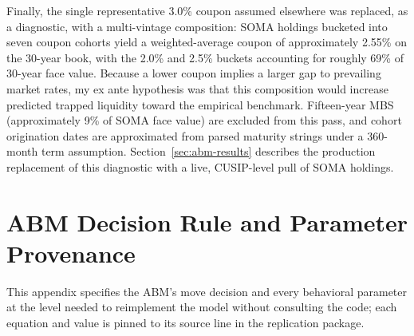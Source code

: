 \documentclass[12pt]{article}
\begin{document}
Finally, the single representative 3.0\% coupon assumed elsewhere was replaced, as a diagnostic, with a multi-vintage composition: SOMA holdings bucketed into seven coupon cohorts yield a weighted-average coupon of approximately 2.55\% on the 30-year book, with the 2.0\% and 2.5\% buckets accounting for roughly 69\% of 30-year face value. Because a lower coupon implies a larger gap to prevailing market rates, my ex ante hypothesis was that this composition would increase predicted trapped liquidity toward the empirical benchmark. Fifteen-year MBS (approximately 9\% of SOMA face value) are excluded from this pass, and cohort origination dates are approximated from parsed maturity strings under a 360-month term assumption. Section~\ref{sec:abm-results} describes the production replacement of this diagnostic with a live, CUSIP-level pull of SOMA holdings.

\section{ABM Decision Rule and Parameter Provenance}\label{app:abmspec}

This appendix specifies the ABM's move decision and every behavioral parameter at the level needed to reimplement the model without consulting the code; each equation and value is pinned to its source line in the replication package.
\end{document}
